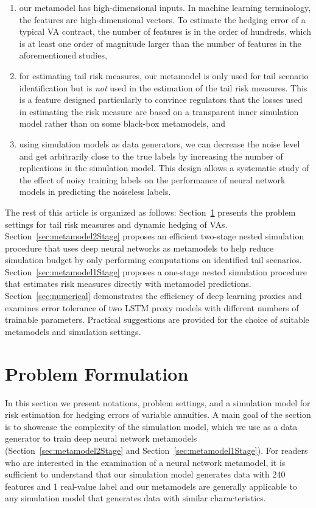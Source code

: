 \documentclass{article}
\begin{document}
\begin{enumerate}
    \item  our metamodel has high-dimensional inputs. In machine learning terminology, the features are high-dimensional vectors.
    To estimate the hedging error of a typical VA contract, the number of features is in the order of hundreds, which is at least one order of magnitude larger than the number of features in the aforementioned studies,
    \item  for estimating tail risk measures, our metamodel is only used for tail scenario identification but is \textit{not} used in the estimation of the tail risk measures.
    This is a feature designed particularly to convince regulators that the losses used in estimating the risk measure are based on a transparent inner simulation model rather than on some black-box metamodels, and
    \item  using simulation models as data generators, we can decrease the noise level and get arbitrarily close to the true labels by increasing the number of replications in the simulation model.
    This design allows a systematic study of the effect of noisy training labels on the performance of neural network models in predicting the noiseless labels.
\end{enumerate}

The rest of this article is organized as follows: 
Section~\ref{sec:problem-formulation} presents the problem settings for tail risk measures and dynamic hedging of VAs. 
Section~\ref{sec:metamodel2Stage} proposes an efficient two-stage nested simulation procedure that uses deep neural networks as metamodels to help reduce simulation budget by only performing computations on identified tail scenarios. 
Section~\ref{sec:metamodel1Stage} proposes a one-stage nested simulation procedure that estimates risk measures directly with metamodel predictions.
Section~\ref{sec:numerical} demonstrates the efficiency of deep learning proxies and examines error tolerance of two LSTM proxy models with different numbers of trainable parameters. 
Practical suggestions are provided for the choice of suitable metamodels and simulation settings. 

\section{Problem Formulation} \label{sec:problem-formulation}

In this section we present notations, problem settings, and a simulation model for risk estimation for hedging errors of variable annuities.
A main goal of the section is to showcase the complexity of the simulation model, which we use as a data generator to train deep neural network metamodels (Section~\ref{sec:metamodel2Stage} and Section~\ref{sec:metamodel1Stage}).
For readers who are interested in the examination of a neural network metamodel, it is sufficient to understand that our simulation model generates data with 240 features and 1 real-value label and our metamodels are generally applicable to any simulation model that generates data with similar characteristics.
\end{document}
